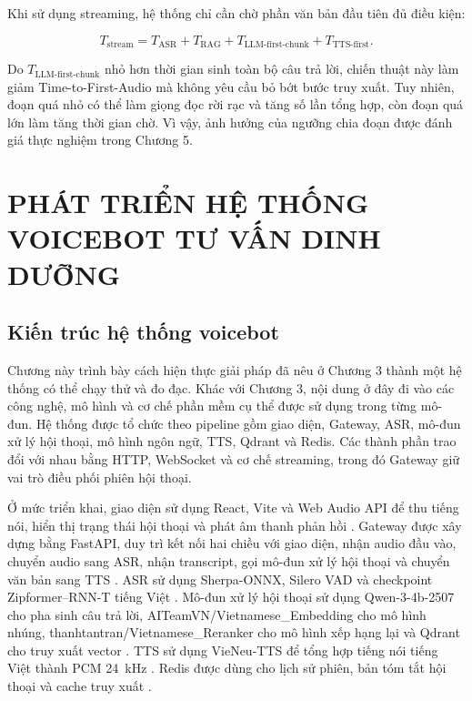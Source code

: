 \documentclass[a4paper,13pt,twoside]{report}
\begin{document}
Khi sử dụng streaming, hệ thống chỉ cần chờ phần văn bản đầu tiên đủ điều kiện:

\begin{equation}
    T_{\mathrm{stream}}
    =
    T_{\mathrm{ASR}}
    +T_{\mathrm{RAG}}
    +T_{\mathrm{LLM\text{-}first\text{-}chunk}}
    +T_{\mathrm{TTS\text{-}first}}.
\end{equation}

Do \(T_{\mathrm{LLM\text{-}first\text{-}chunk}}\) nhỏ hơn thời gian sinh toàn bộ câu trả lời, chiến thuật này làm giảm Time-to-First-Audio mà không yêu cầu bỏ bớt bước truy xuất. Tuy nhiên, đoạn quá nhỏ có thể làm giọng đọc rời rạc và tăng số lần tổng hợp, còn đoạn quá lớn làm tăng thời gian chờ. Vì vậy, ảnh hưởng của ngưỡng chia đoạn được đánh giá thực nghiệm trong Chương 5.


\chapter{PHÁT TRIỂN HỆ THỐNG VOICEBOT TƯ VẤN DINH DƯỠNG}

\section{Kiến trúc hệ thống voicebot}

Chương này trình bày cách hiện thực giải pháp đã nêu ở Chương 3 thành một hệ thống có thể chạy thử và đo đạc. Khác với Chương 3, nội dung ở đây đi vào các công nghệ, mô hình và cơ chế phần mềm cụ thể được sử dụng trong từng mô-đun. Hệ thống được tổ chức theo pipeline gồm giao diện, Gateway, ASR, mô-đun xử lý hội thoại, mô hình ngôn ngữ, TTS, Qdrant và Redis. Các thành phần trao đổi với nhau bằng HTTP, WebSocket và cơ chế streaming, trong đó Gateway giữ vai trò điều phối phiên hội thoại.

Ở mức triển khai, giao diện sử dụng React, Vite và Web Audio API để thu tiếng nói, hiển thị trạng thái hội thoại và phát âm thanh phản hồi \cite{react,vite,webaudio}. Gateway được xây dựng bằng FastAPI, duy trì kết nối hai chiều với giao diện, nhận audio đầu vào, chuyển audio sang ASR, nhận transcript, gọi mô-đun xử lý hội thoại và chuyển văn bản sang TTS \cite{fastapi}. ASR sử dụng Sherpa-ONNX, Silero VAD và checkpoint Zipformer--RNN-T tiếng Việt \cite{sherpaonnx,silerovad,zipformer6000h}. Mô-đun xử lý hội thoại sử dụng Qwen-3-4b-2507 cho pha sinh câu trả lời, AITeamVN/Vietnamese\_Embedding cho mô hình nhúng, thanhtantran/Vietnamese\_Reranker cho mô hình xếp hạng lại và Qdrant cho truy xuất vector \cite{qwen3modelcard,vietembedding,vietreranker,qdrant}. TTS sử dụng VieNeu-TTS để tổng hợp tiếng nói tiếng Việt thành PCM 24~kHz \cite{vieneutts}. Redis được dùng cho lịch sử phiên, bản tóm tắt hội thoại và cache truy xuất \cite{redis}.
\end{document}
